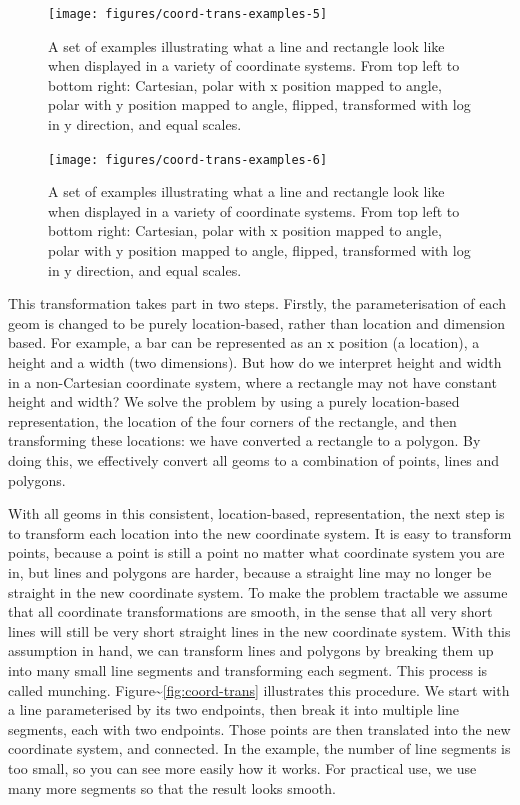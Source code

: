 \begin{figure}
\end{figure}\begin{figure}
\texttt{[image: figures/coord-trans-examples-5]} \caption{A set of examples illustrating what a line and rectangle look like when displayed in a variety of coordinate systems.  From top left to bottom right: Cartesian, polar with x position mapped to angle, polar with y position mapped to angle, flipped, transformed with log in y direction, and equal scales.\label{fig:coord-trans-examples5}}
\end{figure}\begin{figure}
\texttt{[image: figures/coord-trans-examples-6]} \caption{A set of examples illustrating what a line and rectangle look like when displayed in a variety of coordinate systems.  From top left to bottom right: Cartesian, polar with x position mapped to angle, polar with y position mapped to angle, flipped, transformed with log in y direction, and equal scales.\label{fig:coord-trans-examples6}}
\end{figure}

This transformation takes part in two steps. Firstly, the
parameterisation of each geom is changed to be purely location-based,
rather than location and dimension based. For example, a bar can be
represented as an x position (a location), a height and a width (two
dimensions). But how do we interpret height and width in a non-Cartesian
coordinate system, where a rectangle may not have constant height and
width? We solve the problem by using a purely location-based
representation, the location of the four corners of the rectangle, and
then transforming these locations: we have converted a rectangle to a
polygon. By doing this, we effectively convert all geoms to a
combination of points, lines and polygons.
 

With all geoms in this consistent, location-based, representation, the
next step is to transform each location into the new coordinate system.
It is easy to transform points, because a point is still a point no
matter what coordinate system you are in, but lines and polygons are
harder, because a straight line may no longer be straight in the new
coordinate system. To make the problem tractable we assume that all
coordinate transformations are smooth, in the sense that all very short
lines will still be very short straight lines in the new coordinate
system. With this assumption in hand, we can transform lines and
polygons by breaking them up into many small line segments and
transforming each segment. This process is called munching.
 Figure\textasciitilde{}\ref{fig:coord-trans}
illustrates this procedure. We start with a line parameterised by its
two endpoints, then break it into multiple line segments, each with two
endpoints. Those points are then translated into the new coordinate
system, and connected. In the example, the number of line segments is
too small, so you can see more easily how it works. For practical use,
we use many more segments so that the result looks smooth.

